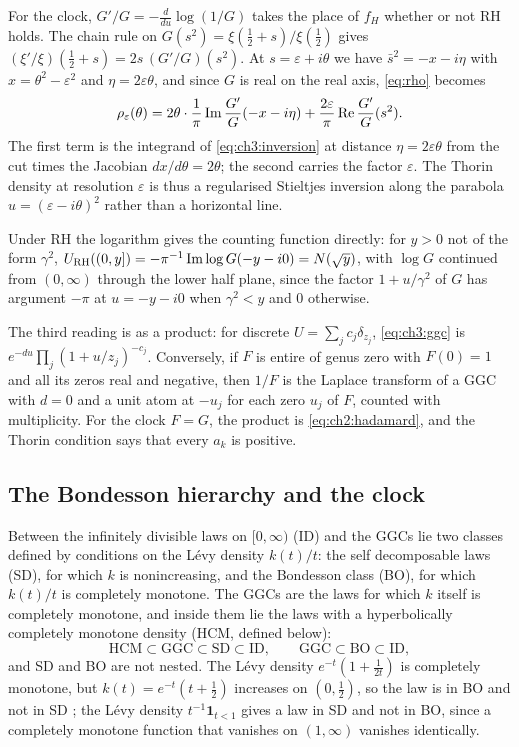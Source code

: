 For the clock, $G'/G=-\frac d{du}\log(1/G)$ takes the place of $f_H$ whether or not RH holds. The chain rule on $G(s^2)=\xi(\frac12+s)/\xi(\frac12)$ gives $(\xi'/\xi)(\frac12+s)=2s\,(G'/G)(s^2)$. At $s=\varepsilon+i\theta$ we have $\bar s^2=-x-i\eta$ with $x=\theta^2-\varepsilon^2$ and $\eta=2\varepsilon\theta$, and since $G$ is real on the real axis, \eqref{eq:rho} becomes
\[
\rho_\varepsilon(\theta)=2\theta\cdot\frac1\pi\operatorname{Im}\frac{G'}{G}(-x-i\eta)+\frac{2\varepsilon}\pi\operatorname{Re}\frac{G'}{G}(s^2).
\]
The first term is the integrand of \eqref{eq:ch3:inversion} at distance $\eta=2\varepsilon\theta$ from the cut times the Jacobian $dx/d\theta=2\theta$; the second carries the factor $\varepsilon$. The Thorin density at resolution $\varepsilon$ is thus a regularised Stieltjes inversion along the parabola $u=(\varepsilon-i\theta)^2$ rather than a horizontal line.

Under RH the logarithm gives the counting function directly: for $y>0$ not of the form $\gamma^2$, $U_{\mathrm{RH}}((0,y])=-\pi^{-1}\operatorname{Im}\log G(-y-i0)=N(\sqrt y)$, with $\log G$ continued from $(0,\infty)$ through the lower half plane, since the factor $1+u/\gamma^2$ of $G$ has argument $-\pi$ at $u=-y-i0$ when $\gamma^2<y$ and $0$ otherwise.

The third reading is as a product: for discrete $U=\sum_jc_j\delta_{z_j}$, \eqref{eq:ch3:ggc} is $e^{-du}\prod_j(1+u/z_j)^{-c_j}$. Conversely, if $F$ is entire of genus zero with $F(0)=1$ and all its zeros real and negative, then $1/F$ is the Laplace transform of a GGC with $d=0$ and a unit atom at $-u_j$ for each zero $u_j$ of $F$, counted with multiplicity. For the clock $F=G$, the product is \eqref{eq:ch2:hadamard}, and the Thorin condition says that every $a_k$ is positive.

\subsection{The Bondesson hierarchy and the clock}\label{sec:ch3:hierarchy}

Between the infinitely divisible laws on $[0,\infty)$ (ID) and the GGCs lie two classes defined by conditions on the L\'evy density $k(t)/t$: the self decomposable laws (SD), for which $k$ is nonincreasing, and the Bondesson class (BO), for which $k(t)/t$ is completely monotone. The GGCs are the laws for which $k$ itself is completely monotone, and inside them lie the laws with a hyperbolically completely monotone density (HCM, defined below):
\[
\mathrm{HCM}\subset\mathrm{GGC}\subset\mathrm{SD}\subset\mathrm{ID},\qquad \mathrm{GGC}\subset\mathrm{BO}\subset\mathrm{ID},
\]
and SD and BO are not nested. The L\'evy density $e^{-t}(1+\frac1{2t})$ is completely monotone, but $k(t)=e^{-t}(t+\frac12)$ increases on $(0,\frac12)$, so the law is in BO and not in SD \cite[Section 2]{P17}; the L\'evy density $t^{-1}\mathbf 1_{t<1}$ gives a law in SD and not in BO, since a completely monotone function that vanishes on $(1,\infty)$ vanishes identically.

